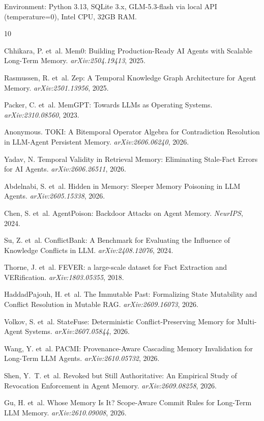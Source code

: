 \documentclass{article}
\begin{document}
Environment: Python 3.13, SQLite 3.x, GLM-5.3-flash via local API (temperature=0), Intel CPU, 32GB RAM.

\begin{thebibliography}{10}

Chhikara, P. et~al.
\newblock Mem0: Building Production-Ready AI Agents with Scalable Long-Term Memory.
\newblock \emph{arXiv:2504.19413}, 2025.

Rasmussen, R. et~al.
\newblock Zep: A Temporal Knowledge Graph Architecture for Agent Memory.
\newblock \emph{arXiv:2501.13956}, 2025.

Packer, C. et~al.
\newblock MemGPT: Towards LLMs as Operating Systems.
\newblock \emph{arXiv:2310.08560}, 2023.

Anonymous.
\newblock TOKI: A Bitemporal Operator Algebra for Contradiction Resolution in LLM-Agent Persistent Memory.
\newblock \emph{arXiv:2606.06240}, 2026.

Yadav, N.
\newblock Temporal Validity in Retrieval Memory: Eliminating Stale-Fact Errors for AI Agents.
\newblock \emph{arXiv:2606.26511}, 2026.

Abdelnabi, S. et~al.
\newblock Hidden in Memory: Sleeper Memory Poisoning in LLM Agents.
\newblock \emph{arXiv:2605.15338}, 2026.

Chen, S. et~al.
\newblock AgentPoison: Backdoor Attacks on Agent Memory.
\newblock \emph{NeurIPS}, 2024.

Su, Z. et~al.
\newblock ConflictBank: A Benchmark for Evaluating the Influence of Knowledge Conflicts in LLM.
\newblock \emph{arXiv:2408.12076}, 2024.

Thorne, J. et~al.
\newblock FEVER: a large-scale dataset for Fact Extraction and VERification.
\newblock \emph{arXiv:1803.05355}, 2018.


HaddadPajouh, H. et~al.
\newblock The Immutable Past: Formalizing State Mutability and Conflict Resolution in Mutable RAG.
\newblock \emph{arXiv:2609.16073}, 2026.

Volkov, S. et~al.
\newblock StateFuse: Deterministic Conflict-Preserving Memory for Multi-Agent Systems.
\newblock \emph{arXiv:2607.05844}, 2026.

Wang, Y. et~al.
\newblock PACMI: Provenance-Aware Cascading Memory Invalidation for Long-Term LLM Agents.
\newblock \emph{arXiv:2610.05732}, 2026.

Shen, Y.~T. et~al.
\newblock Revoked but Still Authoritative: An Empirical Study of Revocation Enforcement in Agent Memory.
\newblock \emph{arXiv:2609.08258}, 2026.

Gu, H. et~al.
\newblock Whose Memory Is It? Scope-Aware Commit Rules for Long-Term LLM Memory.
\newblock \emph{arXiv:2610.09008}, 2026.
\end{thebibliography}
\end{document}
